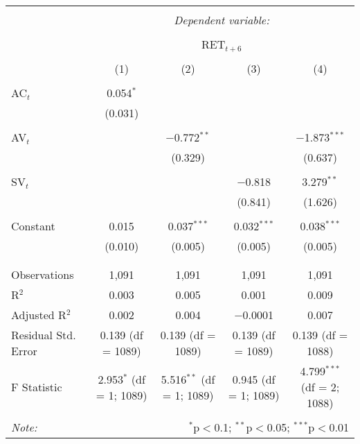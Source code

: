 
\begin{table}[!htbp] \centering 
  \caption{} 
  \label{} 
\begin{tabular}{@{\extracolsep{5pt}}lcccc} 
\\[-1.8ex]\hline 
\hline \\[-1.8ex] 
 & \multicolumn{4}{c}{\textit{Dependent variable:}} \\ 
\cline{2-5} 
\\[-1.8ex] & \multicolumn{4}{c}{RET$_{t+6}$} \\ 
\\[-1.8ex] & (1) & (2) & (3) & (4)\\ 
\hline \\[-1.8ex] 
 AC$_{t}$ & 0.054$^{*}$ &  &  &  \\ 
  & (0.031) &  &  &  \\ 
  & & & & \\ 
 AV$_{t}$ &  & $-$0.772$^{**}$ &  & $-$1.873$^{***}$ \\ 
  &  & (0.329) &  & (0.637) \\ 
  & & & & \\ 
 SV$_{t}$ &  &  & $-$0.818 & 3.279$^{**}$ \\ 
  &  &  & (0.841) & (1.626) \\ 
  & & & & \\ 
 Constant & 0.015 & 0.037$^{***}$ & 0.032$^{***}$ & 0.038$^{***}$ \\ 
  & (0.010) & (0.005) & (0.005) & (0.005) \\ 
  & & & & \\ 
\hline \\[-1.8ex] 
Observations & 1,091 & 1,091 & 1,091 & 1,091 \\ 
R$^{2}$ & 0.003 & 0.005 & 0.001 & 0.009 \\ 
Adjusted R$^{2}$ & 0.002 & 0.004 & $-$0.0001 & 0.007 \\ 
Residual Std. Error & 0.139 (df = 1089) & 0.139 (df = 1089) & 0.139 (df = 1089) & 0.139 (df = 1088) \\ 
F Statistic & 2.953$^{*}$ (df = 1; 1089) & 5.516$^{**}$ (df = 1; 1089) & 0.945 (df = 1; 1089) & 4.799$^{***}$ (df = 2; 1088) \\ 
\hline 
\hline \\[-1.8ex] 
\textit{Note:}  & \multicolumn{4}{r}{$^{*}$p$<$0.1; $^{**}$p$<$0.05; $^{***}$p$<$0.01} \\ 
\end{tabular} 
\end{table} 
